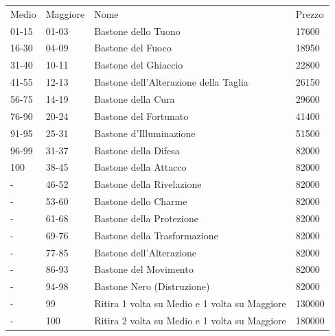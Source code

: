 \documentclass[a4paper,11pt,twoside,openany]{book}
\begin{document}
\begin{tabularx}{\textwidth}{llXl}
	\toprule
	Medio & Maggiore & Nome                                                                                & Prezzo\tabularnewline
	01-15 & 01-03    & Bastone dello Tuono \index{Bastone dello Tuono}                                     & 17600\tabularnewline
	16-30 & 04-09    & Bastone del Fuoco \index{Bastone del Fuoco}                                         & 18950\tabularnewline
	31-40 & 10-11    & Bastone del Ghiaccio \index{Bastone del Ghiaccio}                                   & 22800\tabularnewline
	41-55 & 12-13    & Bastone dell'Alterazione della Taglia \index{Bastone dell'Alterazione della Taglia} & 26150\tabularnewline
	56-75 & 14-19    & Bastone della Cura \index{Bastone della Cura}                                       & 29600\tabularnewline
	76-90 & 20-24    & Bastone del Fortunato \index{Bastone del Fortunato}                                 & 41400\tabularnewline
	91-95 & 25-31    & Bastone d'Illuminazione \index{Bastone d'Illuminazione}                             & 51500\tabularnewline
	96-99 & 31-37    & Bastone della Difesa \index{Bastone della Difesa}                                   & 82000\tabularnewline
	100   & 38-45    & Bastone della Attacco \index{Bastone della Attacco}                                 & 82000\tabularnewline
	-     & 46-52    & Bastone della Rivelazione \index{Bastone della Rivelazione}                         & 82000\tabularnewline
	-     & 53-60    & Bastone dello Charme \index{Bastone dello Charme}                                   & 82000\tabularnewline
	-     & 61-68    & Bastone della Protezione \index{Bastone della Protezione}                           & 82000\tabularnewline
	-     & 69-76    & Bastone della Trasformazione \index{Bastone della Trasformazione}                   & 82000\tabularnewline
	-     & 77-85    & Bastone dell'Alterazione \index{Bastone dell'Alterazione}                           & 82000\tabularnewline
	-     & 86-93    & Bastone del Movimento \index{Bastone del Movimento}                                 & 82000\tabularnewline
	-     & 94-98    & Bastone Nero (Distruzione) \index{Bastone Nero (Distruzione)}                       & 82000\tabularnewline
	-     & 99       & Ritira 1 volta su Medio e 1 volta su Maggiore                                       & 130000\tabularnewline
	-     & 100      & Ritira 2 volta su Medio e 1 volta su Maggiore                                       & 180000\tabularnewline
\end{tabularx}

\bigskip
\end{document}
